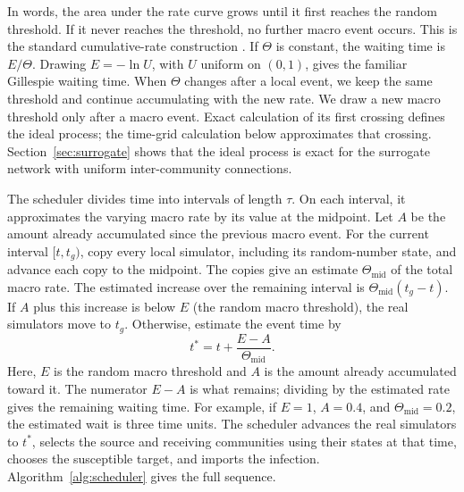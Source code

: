 \documentclass{ieeeaccess}
\begin{document}
In words, the area under the rate curve grows until it first reaches the random threshold. If it never reaches the threshold, no further macro event occurs. This is the standard cumulative-rate construction \cite{ethier1986,anderson2007}. If $\Theta$ is constant, the waiting time is $E/\Theta$. Drawing $E=-\ln U$, with $U$ uniform on $(0,1)$, gives the familiar Gillespie waiting time. When $\Theta$ changes after a local event, we keep the same threshold and continue accumulating with the new rate. We draw a new macro threshold only after a macro event. Exact calculation of its first crossing defines the ideal process; the time-grid calculation below approximates that crossing. Section~\ref{sec:surrogate} shows that the ideal process is exact for the surrogate network with uniform inter-community connections.

The scheduler divides time into intervals of length $\tau$. On each interval, it approximates the varying macro rate by its value at the midpoint. Let $A$ be the amount already accumulated since the previous macro event. For the current interval $[t,t_g)$, copy every local simulator, including its random-number state, and advance each copy to the midpoint. The copies give an estimate $\Theta_{\mathrm{mid}}$ of the total macro rate. The estimated increase over the remaining interval is $\Theta_{\mathrm{mid}}(t_g-t)$. If $A$ plus this increase is below $E$ (the random macro threshold), the real simulators move to $t_g$. Otherwise, estimate the event time by
\begin{equation}
\label{eq:interpolation}
t^\ast=t+\frac{E-A}{\Theta_{\mathrm{mid}}}.
\end{equation}
Here, $E$ is the random macro threshold and $A$ is the amount already accumulated toward it. The numerator $E-A$ is what remains; dividing by the estimated rate gives the remaining waiting time. For example, if $E=1$, $A=0.4$, and $\Theta_{\mathrm{mid}}=0.2$, the estimated wait is three time units. The scheduler advances the real simulators to $t^\ast$, selects the source and receiving communities using their states at that time, chooses the susceptible target, and imports the infection. Algorithm~\ref{alg:scheduler} gives the full sequence.
\end{document}
